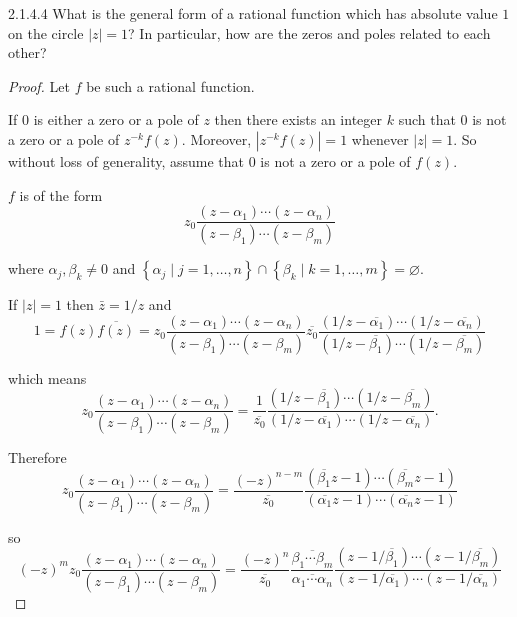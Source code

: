 \begin{problem}{2.1.4.4}
What is the general form of a rational function which has absolute value \( 1 \) on the circle \( |z| = 1 \)? In particular, how are the zeros and poles related to each other?
\end{problem}

\begin{proof}
	Let \( f \) be such a rational function.

	If \( 0 \) is either a zero or a pole of \( z \) then there exists an integer \( k \) such that \( 0 \) is not a zero or a pole of \( z^{-k}f(z) \). Moreover, \( \left\vert z^{-k}f(z) \right\vert = 1 \) whenever \( \left\vert z \right\vert = 1 \). So without loss of generality, assume that \( 0 \) is not a zero or a pole of \( f(z) \).

	\( f \) is of the form
	\[
		z_{0} \dfrac{(z - \alpha_{1}) \cdots (z - \alpha_{n})}{(z - \beta_{1}) \cdots (z - \beta_{m})}
	\]

	where \( \alpha_{j}, \beta_{k} \ne 0 \) and \( \left\{ \alpha_{j} \mid j = 1, \ldots, n \right\} \cap \left\{ \beta_{k} \mid k = 1, \ldots, m \right\} = \varnothing \).

	If \( \left\vert z \right\vert = 1 \) then \( \bar{z} = 1/z \) and
	\[
		1 = f(z) \overline{f(z)} = z_{0} \dfrac{(z - \alpha_{1}) \cdots (z - \alpha_{n})}{(z - \beta_{1}) \cdots (z - \beta_{m})} \overline{z_{0}} \dfrac{(1/z - \overline{\alpha_{1}}) \cdots (1/z - \overline{\alpha_{n}})}{(1/z - \overline{\beta_{1}}) \cdots (1/z - \overline{\beta_{m}})}
	\]

	which means
	\[
		z_{0} \dfrac{(z - \alpha_{1}) \cdots (z - \alpha_{n})}{(z - \beta_{1}) \cdots (z - \beta_{m})} = \dfrac{1}{\overline{z_{0}}} \dfrac{(1/z - \overline{\beta_{1}}) \cdots (1/z - \overline{\beta_{m}})}{(1/z - \overline{\alpha_{1}}) \cdots (1/z - \overline{\alpha_{n}})}.
	\]

	Therefore
	\[
		z_{0} \dfrac{(z - \alpha_{1}) \cdots (z - \alpha_{n})}{(z - \beta_{1}) \cdots (z - \beta_{m})} = \dfrac{{(-z)}^{n-m}}{\overline{z_{0}}}\dfrac{(\overline{\beta_{1}}z - 1)\cdots (\overline{\beta_{m}}z - 1)}{(\overline{\alpha_{1}}z - 1)\cdots (\overline{\alpha_{n}}z - 1)}
	\]

	so
	\[
		{(-z)}^{m}z_{0} \dfrac{(z - \alpha_{1}) \cdots (z - \alpha_{n})}{(z - \beta_{1}) \cdots (z - \beta_{m})} = \dfrac{{(-z)}^{n}}{\overline{z_{0}}} \dfrac{\overline{\beta_{1} \cdots \beta_{m}}}{\overline{\alpha_{1} \cdots \alpha_{n}}} \dfrac{(z - 1/\overline{\beta_{1}}) \cdots (z - 1/\overline{\beta_{m}})}{(z - 1/\overline{\alpha_{1}}) \cdots (z - 1/\overline{\alpha_{n}})}
	\]


\end{proof}
